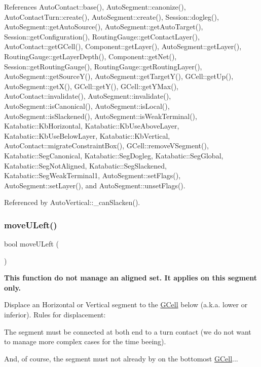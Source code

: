 References Auto\+Contact\+::base(), Auto\+Segment\+::canonize(), Auto\+Contact\+Turn\+::create(), Auto\+Segment\+::create(), Session\+::dogleg(), Auto\+Segment\+::get\+Auto\+Source(), Auto\+Segment\+::get\+Auto\+Target(), Session\+::get\+Configuration(), Routing\+Gauge\+::get\+Contact\+Layer(), Auto\+Contact\+::get\+G\+Cell(), Component\+::get\+Layer(), Auto\+Segment\+::get\+Layer(), Routing\+Gauge\+::get\+Layer\+Depth(), Component\+::get\+Net(), Session\+::get\+Routing\+Gauge(), Routing\+Gauge\+::get\+Routing\+Layer(), Auto\+Segment\+::get\+Source\+Y(), Auto\+Segment\+::get\+Target\+Y(), G\+Cell\+::get\+Up(), Auto\+Segment\+::get\+X(), G\+Cell\+::get\+Y(), G\+Cell\+::get\+Y\+Max(), Auto\+Contact\+::invalidate(), Auto\+Segment\+::invalidate(), Auto\+Segment\+::is\+Canonical(), Auto\+Segment\+::is\+Local(), Auto\+Segment\+::is\+Slackened(), Auto\+Segment\+::is\+Weak\+Terminal(), Katabatic\+::\+Kb\+Horizontal, Katabatic\+::\+Kb\+Use\+Above\+Layer, Katabatic\+::\+Kb\+Use\+Below\+Layer, Katabatic\+::\+Kb\+Vertical, Auto\+Contact\+::migrate\+Constraint\+Box(), G\+Cell\+::remove\+V\+Segment(), Katabatic\+::\+Seg\+Canonical, Katabatic\+::\+Seg\+Dogleg, Katabatic\+::\+Seg\+Global, Katabatic\+::\+Seg\+Not\+Aligned, Katabatic\+::\+Seg\+Slackened, Katabatic\+::\+Seg\+Weak\+Terminal1, Auto\+Segment\+::set\+Flags(), Auto\+Segment\+::set\+Layer(), and Auto\+Segment\+::unset\+Flags().



Referenced by Auto\+Vertical\+::\+\_\+can\+Slacken().

\mbox{\label{classKatabatic_1_1AutoVertical_a1fa2421b74bf0eb934b7002fd3da2321}} 
\subsubsection{\texorpdfstring{move\+U\+Left()}{moveULeft()}}
{\footnotesize\ttfamily bool move\+U\+Left (\begin{DoxyParamCaption}{ }\end{DoxyParamCaption})\hspace{0.3cm}{\ttfamily [virtual]}}

{\bfseries This function do not manage an aligned set. It applies on {\ttfamily this} segment only.}

Displace an Horizontal or Vertical segment to the \hyperlink{classKatabatic_1_1GCell}{G\+Cell} below (a.\+k.\+a. lower or inferior). Rules for displacement\+:
\begin{DoxyItemize}
\item The segment must be connected at both end to a turn contact (we do not want to manage more complex cases for the time beeing).
\item And, of course, the segment must not already by on the bottomost \hyperlink{classKatabatic_1_1GCell}{G\+Cell}...
\end{DoxyItemize}

